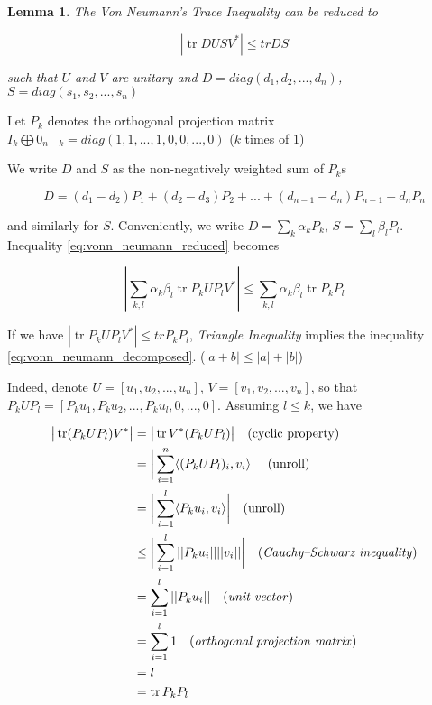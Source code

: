 \documentclass{article}
\DeclareMathOperator{\tr}{tr}
\newtheorem{lemma}{Lemma}
\begin{document}
\begin{lemma}
\label{lem:1}
The Von Neumann's Trace Inequality can be reduced to 

\begin{equation}
    \label{eq:vonn_neumann_reduced}
    |\tr D U S V^*| \leq tr D S
\end{equation}

such that $U$ and $V$ are unitary and $D = diag(d_1, d_2, ..., d_n)$, $S = diag(s_1, s_2, ..., s_n)$
\end{lemma}

Let $P_k$ denotes the orthogonal projection matrix $I_k \bigoplus 0_{n-k} = diag(1, 1, ..., 1, 0, 0, ..., 0)$ ($k$ times of $1$)

We write $D$ and $S$ as the non-negatively weighted sum of $P_k$s

\begin{equation}
    D = (d_1 - d_2) P_1 + (d_2 - d_3) P_2 + ... + (d_{n-1} - d_n) P_{n-1} + d_n P_n
\end{equation}

and similarly for $S$. Conveniently, we write $D = \sum_k \alpha_k P_k$, $S = \sum_l \beta_l P_l$. Inequality \ref{eq:vonn_neumann_reduced} becomes

\begin{equation}
    \label{eq:vonn_neumann_decomposed}
    |\sum_{k, l} \alpha_k \beta_l \tr P_k U P_l V^*| \leq \sum_{k, l} \alpha_k \beta_l \tr P_k P_l
\end{equation}

If we have $|\tr P_k U P_l V^*| \leq tr P_k P_l$, \emph{Triangle Inequality} implies the inequality \ref{eq:vonn_neumann_decomposed}. ($|a + b| \leq |a| + |b|$)

Indeed, denote $U = [u_1, u_2, ..., u_n]$, $V = [v_1, v_2, ..., v_n]$, so that $P_k U P_l = [P_k u_1, P_k u_2, ..., P_k u_l, 0, ..., 0]$. Assuming $l \leq k$, we have

\begin{equation}
\begin{split}
     \big|\tr (P_k U P_l) V^*\big|  &= \big|\tr V^* (P_k U P_l) \big| \quad \text{(cyclic property)} \\  
                                    &= \bigg| \sum_{i=1}^n \langle (P_k U P_l)_i, v_i \rangle \bigg| \quad \text{(unroll)} \\
                                    &= \bigg| \sum_{i=1}^l \langle P_k u_i, v_i \rangle \bigg| \quad \text{(unroll)} \\
                                    &\leq \bigg| \sum_{i=1}^l ||P_k u_i|| ||v_i|| \bigg| \quad \text{(\emph{Cauchy–Schwarz inequality})} \\
                                    &= \sum_{i=1}^l ||P_k u_i|| \quad \text{(\emph{unit vector})} \\
                                    &= \sum_{i=1}^l 1 \quad \text{(\emph{orthogonal projection matrix})} \\
                                    &= l \\
                                    &= \tr P_k P_l
\end{split}
\end{equation}
\end{document}
